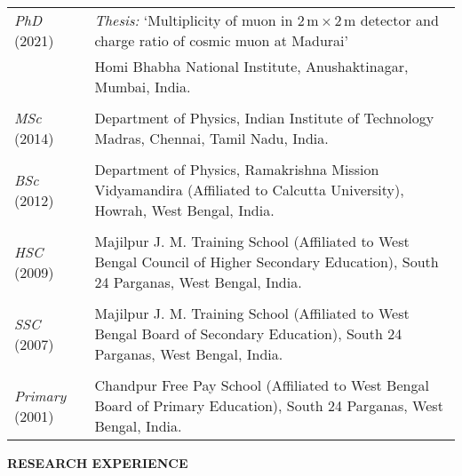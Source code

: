 \documentclass[12pt]{article}
\begin{document}
\vspace{0.4cm}
\begin{tabular}{p{3cm} p{14cm} }

  {\emph{PhD} (2021)} &  \emph{Thesis:} `Multiplicity of muon in $2$\,m\,$\times$\,2\,m detector and charge ratio of cosmic muon at Madurai'\\
  \vspace{0.2cm}
  & Homi Bhabha National Institute, Anushaktinagar, Mumbai, India. \\
  & \\
  {\emph{MSc} (2014)} & Department of Physics, Indian Institute of Technology Madras, Chennai, Tamil Nadu, India.\\
  & \\
  {\emph{BSc} (2012)} & Department of Physics, Ramakrishna Mission Vidyamandira (Affiliated to Calcutta University), Howrah, West Bengal, India.\\
  & \\
  {\emph{HSC} (2009)} & Majilpur J. M. Training School (Affiliated to West Bengal Council of Higher Secondary Education), South 24 Parganas, West Bengal, India. \\
  & \\
  {\emph{SSC} (2007)} & Majilpur J. M. Training School (Affiliated to West Bengal Board of Secondary Education), South 24 Parganas, West Bengal, India. \\
  & \\
  {\emph{Primary} (2001)} & Chandpur Free Pay School (Affiliated to West Bengal Board of Primary Education), South 24 Parganas, West Bengal, India.
  
\end{tabular}

\pagebreak
\vspace{0.5cm}
\colorbox{gray!40}{\begin{minipage}{17.5cm}
\bf {RESEARCH EXPERIENCE } 
\end{minipage} }
\end{document}
